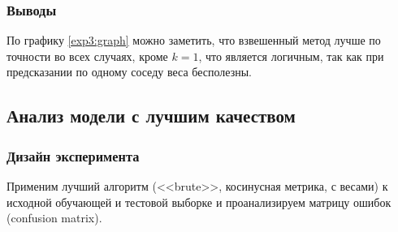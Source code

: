 \documentclass[a4paper, 11pt]{article}
\begin{document}
    \subsubsection{Выводы}
    По графику \ref{exp3:graph} можно заметить, что взвешенный метод лучше по точности во всех случаях, кроме $k = 1$, что является логичным, так как при предсказании по одному соседу веса бесполезны.
    \subsection{Анализ модели с лучшим качеством}
    \subsubsection{Дизайн эксперимента}
    Применим лучший алгоритм (<<brute>>, косинусная метрика, с весами) к исходной обучающей и тестовой выборке и проанализируем матрицу ошибок (confusion matrix).
\end{document}
